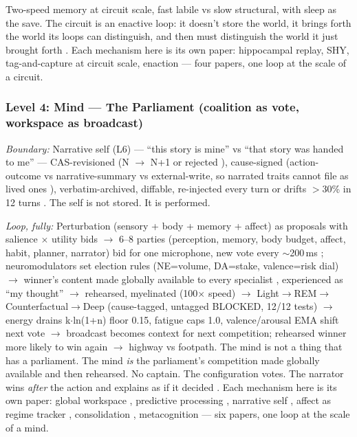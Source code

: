 \documentclass[11pt]{article}
\begin{document}
Two-speed memory at circuit scale, fast labile vs slow structural, with sleep as the save. The circuit is an enactive loop: it doesn't store the world, it brings forth the world its loops can distinguish, and then must distinguish the world it just brought forth \citep{maturana1980}. Each mechanism here is its own paper: hippocampal replay, SHY, tag-and-capture at circuit scale, enaction --- four papers, one loop at the scale of a circuit.

\subsubsection{Level 4: Mind --- The Parliament (coalition as vote, workspace as broadcast)}

\textit{Boundary:} Narrative self (L6) --- ``this story is mine'' vs ``that story was handed to me'' --- CAS-revisioned (N $\to$ N+1 or rejected \citep{ghazali1106ihya}), cause-signed (action-outcome vs narrative-summary vs external-write, so narrated traits cannot file as lived ones \citep{ibnarabi1229fusus}), verbatim-archived, diffable, re-injected every turn or drifts $>$30\% in 12 turns \citep{choi2024}. The self is not stored. It is performed.

\textit{Loop, fully:} Perturbation (sensory + body + memory + affect) as proposals with salience $\times$ utility bids $\to$ 6--8 parties (perception, memory, body budget, affect, habit, planner, narrator) bid for one microphone, new vote every $\sim$200\,ms \citep{baars1997,atallah2026gwt}; neuromodulators set election rules (NE=volume, DA=stake, valence=risk dial) \citep{sofroniew2026} $\to$ winner's content made globally available to every specialist \citep{baars1997}, experienced as ``my thought'' $\to$ rehearsed, myelinated (100$\times$ speed) $\to$ Light$\to$REM$\to$Counterfactual$\to$Deep (cause-tagged, untagged BLOCKED, 12/12 tests) $\to$ energy drains k$\cdot$ln(1+n) floor 0.15, fatigue caps 1.0, valence/arousal EMA shift next vote \citep{seth2021} $\to$ broadcast becomes context for next competition; rehearsed winner more likely to win again $\to$ highway vs footpath. The mind is not a thing that has a parliament. The mind \emph{is} the parliament's competition made globally available and then rehearsed. No captain. The configuration votes. The narrator wins \emph{after} the action and explains as if it decided \citep{gazzaniga2000,johansson2005,nisbett1977}. Each mechanism here is its own paper: global workspace \citep{baars1997}, predictive processing \citep{seth2021,clark2016surfing}, narrative self \citep{choi2024}, affect as regime tracker \citep{sofroniew2026}, consolidation \citep{tononi2014}, metacognition \citep{macar2026,cao2026} --- six papers, one loop at the scale of a mind.
\end{document}
